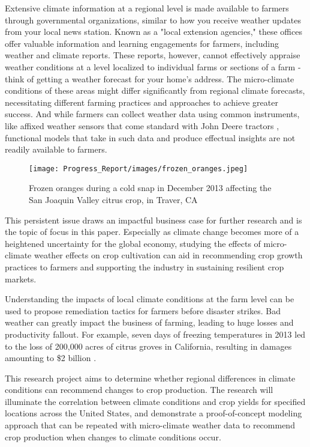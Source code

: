 \documentclass{article}
\begin{document}
Extensive climate information at a regional level is made available to farmers through governmental organizations, similar to how you receive weather updates from your local news station. Known as a "local extension agencies," these offices offer valuable information and learning engagements for farmers, including weather and climate reports. These reports, however, cannot effectively appraise weather conditions at a level localized to individual farms or sections of a farm - think of getting a weather forecast for your home's address. The micro-climate conditions of these areas might differ significantly from regional climate forecasts, necessitating different farming practices and approaches to achieve greater success. And while farmers can collect weather data using common instruments, like affixed weather sensors that come standard with John Deere tractors \citep{JohnDeere}, functional models that take in such data and produce effectual insights are not readily available to farmers. 

\begin{wrapfigure}{r}{0.5\textwidth}
  \begin{center}
    \vspace*{-5mm}
    \texttt{[image: Progress\_Report/images/frozen\_oranges.jpeg]}
  \end{center}
  \vspace*{-5mm}\caption{Frozen oranges during a cold snap in December 2013 affecting the San Joaquin Valley citrus crop, in Traver, CA \citep{Orange}}
\end{wrapfigure}

This persistent issue draws an impactful business case for further research and is the topic of focus in this paper. Especially as climate change becomes more of a heightened uncertainty for the global economy, studying the effects of micro-climate weather effects on crop cultivation can aid in recommending crop growth practices to farmers and supporting the industry in sustaining resilient crop markets.

Understanding the impacts of local climate conditions at the farm level can be used to propose remediation tactics for farmers before disaster strikes. Bad weather can greatly impact the business of farming, leading to huge losses and productivity fallout. For example, seven days of freezing temperatures in 2013 led to the loss of 200,000 acres of citrus groves in California, resulting in damages amounting to \$2 billion \citep{CNBC}.

This research project aims to determine whether regional differences in climate conditions can recommend changes to crop production. The research will illuminate the correlation between climate conditions and crop yields for specified locations across the United States, and demonstrate a proof-of-concept modeling approach that can be repeated with micro-climate weather data to recommend crop production when changes to climate conditions occur.  
\end{document}
